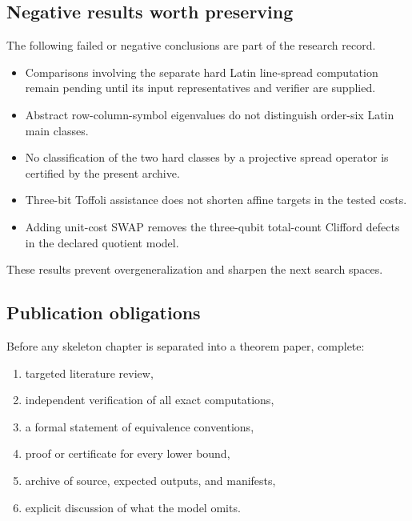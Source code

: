 \subsection{Negative results worth preserving}
The following failed or negative conclusions are part of the research record.
\begin{itemize}
\item Comparisons involving the separate hard Latin line-spread computation remain pending until its input representatives and verifier are supplied.
\item Abstract row-column-symbol eigenvalues do not distinguish order-six Latin main classes.
\item No classification of the two hard classes by a projective spread operator is certified by the present archive.
\item Three-bit Toffoli assistance does not shorten affine targets in the tested costs.
\item Adding unit-cost SWAP removes the three-qubit total-count Clifford defects in the declared quotient model.
\end{itemize}
These results prevent overgeneralization and sharpen the next search spaces.

\subsection{Publication obligations}
Before any skeleton chapter is separated into a theorem paper, complete:
\begin{enumerate}
\item targeted literature review,
\item independent verification of all exact computations,
\item a formal statement of equivalence conventions,
\item proof or certificate for every lower bound,
\item archive of source, expected outputs, and manifests,
\item explicit discussion of what the model omits.
\end{enumerate}

